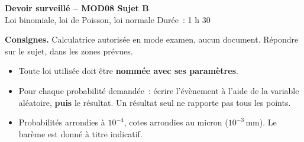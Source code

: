 \documentclass[a4paper,11pt]{article}
\begin{document}
\begin{tcolorbox}[colback=uimmred, colframe=uimmred, sharp corners, boxrule=0pt,
  left=14pt, right=14pt, top=10pt, bottom=10pt]
{\color{white}\LARGE\bfseries Devoir surveillé -- MOD08 \hfill Sujet B}\\[4pt]
{\color{white}\large Loi binomiale, loi de Poisson, loi normale \hfill Durée~: 1 h 30}
\end{tcolorbox}

\vspace{2pt}

\begin{consigne}
\textbf{Consignes.} Calculatrice autorisée en mode examen, aucun document. Répondre sur le sujet, dans les zones prévues.
\begin{itemize}[leftmargin=12pt, itemsep=1pt, topsep=2pt]
  \item Toute loi utilisée doit être \textbf{nommée avec ses paramètres}.
  \item Pour chaque probabilité demandée~: écrire l'évènement à l'aide de la variable aléatoire, \textbf{puis} le résultat. Un résultat seul ne rapporte pas tous les points.
  \item Probabilités arrondies à $10^{-4}$, cotes arrondies au micron ($10^{-3}$\,mm). Le barème est donné à titre indicatif.
\end{itemize}
\end{consigne}
\end{document}
